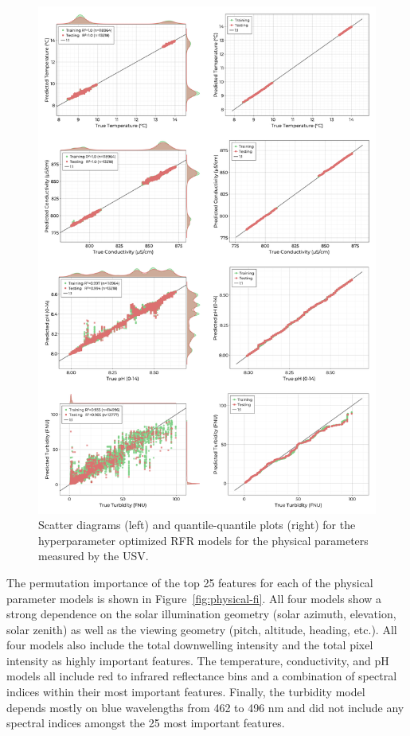 \documentclass[sensors,article,submit,pdftex,moreauthors]{Definitions/mdpi}
\begin{document}
\begin{figure}
\centering
\includegraphics[width=\columnwidth]{paper/figures/results/fits/physical-fitres.png}
\caption{Scatter diagrams (left) and quantile-quantile plots (right) for the hyperparameter optimized RFR models for the physical parameters measured by the USV.\label{fig:physical-fit}}
\end{figure}  

The permutation importance of the top 25 features for each of the physical parameter models is shown in Figure~\ref{fig:physical-fi}. All four models show a strong dependence on the solar illumination geometry (solar azimuth, elevation, solar zenith) as well as the viewing geometry (pitch, altitude, heading, etc.). All four models also include the total downwelling intensity and the total pixel intensity as highly important features. The temperature, conductivity, and pH models all include red to infrared reflectance bins and a combination of spectral indices within their most important features. Finally, the turbidity model depends mostly on blue wavelengths from 462 to 496 nm and did not include any spectral indices amongst the 25 most important features.
\end{document}

